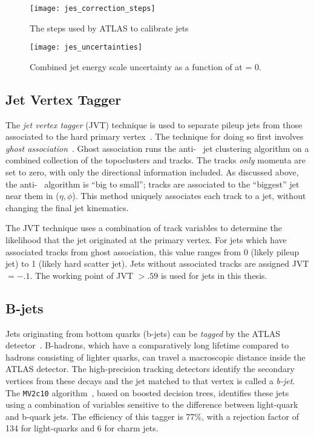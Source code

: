 \begin{figure}
\caption{The steps used by ATLAS to calibrate jets} \label{fig:jes_correction_steps}
\texttt{[image: jes\_correction\_steps]}
\end{figure}


\begin{figure}
\caption{Combined jet energy scale uncertainty as a function of \pt at \eta = 0.} \label{fig:jes_uncertainties}
\texttt{[image: jes\_uncertainties]}
\end{figure}

\subsection{Jet Vertex Tagger}

The \textit{jet vertex tagger} (JVT) technique is used to separate pileup jets from those associated to the hard primary vertex~\cite{ATLAS-CONF-2014-018}.
The technique for doing so first involves \textit{ghost association}~\cite{Cacciari:2008gn}.
Ghost association runs the anti-\kt~ jet clustering algorithm on a combined collection of the topoclusters and tracks.
The tracks \textit{only} momenta are set to zero\footnotemark, with only the directional information included.
As discussed above, the anti-\kt~ algorithm is ``big to small'';  tracks are associated to the ``biggest'' jet near them in ($\eta, \phi$).
This method uniquely associates each track to a jet, without changing the final jet kinematics.

The JVT technique uses a combination of track variables to determine the likelihood that the jet originated at the primary vertex.
For jets which have associated tracks from ghost association, this value ranges from 0 (likely pileup jet) to 1 (likely hard scatter jet).
Jets without associated tracks are assigned JVT $= -.1$.
The  working point of JVT $ > .59$ is used for jets in this thesis.

\subsection{B-jets}

Jets originating from bottom quarks (b-jets) can be \textit{tagged} by the ATLAS detector~\cite{Aad:2015ydr,ATL-PHYS-PUB-2016-012}.
B-hadrons, which have a comparatively long lifetime compared to hadrons consisting of lighter quarks, can travel a macroscopic distance inside the ATLAS detector.
The high-precision tracking detectors identify the secondary vertices from these decays and the jet matched to that vertex is called a \textit{b-jet}.
The \texttt{MV2c10} algorithm~\cite{Aad:2015ydr,ATL-PHYS-PUB-2016-012}, based on boosted decision trees, identifies these jets using a combination of variables sensitive to the difference between light-quark and b-quark jets.
The efficiency of this tagger is 77\%, with a rejection factor of 134 for light-quarks and 6 for charm jets.

